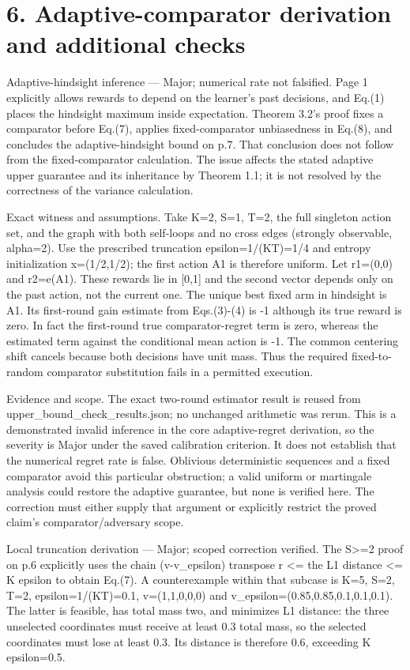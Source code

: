 \documentclass[10pt]{article}
\begin{document}
\section*{6. Adaptive-comparator derivation and additional checks}
Adaptive-hindsight inference — Major; numerical rate not falsified. Page 1 explicitly allows rewards to depend on the learner’s past decisions, and Eq.(1) places the hindsight maximum inside expectation. Theorem 3.2’s proof fixes a comparator before Eq.(7), applies fixed-comparator unbiasedness in Eq.(8), and concludes the adaptive-hindsight bound on p.7. That conclusion does not follow from the fixed-comparator calculation. The issue affects the stated adaptive upper guarantee and its inheritance by Theorem 1.1; it is not resolved by the correctness of the variance calculation.\par
Exact witness and assumptions. Take K=2, S=1, T=2, the full singleton action set, and the graph with both self-loops and no cross edges (strongly observable, alpha=2). Use the prescribed truncation epsilon=1/(KT)=1/4 and entropy initialization x=(1/2,1/2); the first action A1 is therefore uniform. Let r1=(0,0) and r2=e(A1). These rewards lie in [0,1] and the second vector depends only on the past action, not the current one. The unique best fixed arm in hindsight is A1. Its first-round gain estimate from Eqs.(3)-(4) is -1 although its true reward is zero. In fact the first-round true comparator-regret term is zero, whereas the estimated term against the conditional mean action is -1. The common centering shift cancels because both decisions have unit mass. Thus the required fixed-to-random comparator substitution fails in a permitted execution.\par
Evidence and scope. The exact two-round estimator result is reused from upper\_bound\_check\_results.json; no unchanged arithmetic was rerun. This is a demonstrated invalid inference in the core adaptive-regret derivation, so the severity is Major under the saved calibration criterion. It does not establish that the numerical regret rate is false. Oblivious deterministic sequences and a fixed comparator avoid this particular obstruction; a valid uniform or martingale analysis could restore the adaptive guarantee, but none is verified here. The correction must either supply that argument or explicitly restrict the proved claim’s comparator/adversary scope.\par
Local truncation derivation — Major; scoped correction verified. The S>=2 proof on p.6 explicitly uses the chain (v-v\_epsilon) transpose r <= the L1 distance <= K epsilon to obtain Eq.(7). A counterexample within that subcase is K=5, S=2, T=2, epsilon=1/(KT)=0.1, v=(1,1,0,0,0) and v\_epsilon=(0.85,0.85,0.1,0.1,0.1). The latter is feasible, has total mass two, and minimizes L1 distance: the three unselected coordinates must receive at least 0.3 total mass, so the selected coordinates must lose at least 0.3. Its distance is therefore 0.6, exceeding K epsilon=0.5.\par
\end{document}
